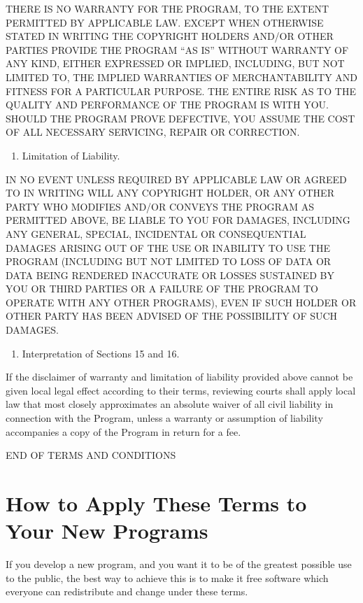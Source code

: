 \documentclass[letterpaper,10pt,english]{sphinxmanual}
\begin{document}
\sphinxAtStartPar
THERE IS NO WARRANTY FOR THE PROGRAM, TO THE EXTENT PERMITTED BY APPLICABLE LAW. EXCEPT WHEN OTHERWISE STATED IN WRITING THE COPYRIGHT HOLDERS AND/OR OTHER PARTIES PROVIDE THE PROGRAM “AS IS” WITHOUT WARRANTY OF ANY KIND, EITHER EXPRESSED OR IMPLIED, INCLUDING, BUT NOT LIMITED TO, THE IMPLIED WARRANTIES OF MERCHANTABILITY AND FITNESS FOR A PARTICULAR PURPOSE. THE ENTIRE RISK AS TO THE QUALITY AND PERFORMANCE OF THE PROGRAM IS WITH YOU. SHOULD THE PROGRAM PROVE DEFECTIVE, YOU ASSUME THE COST OF ALL NECESSARY SERVICING, REPAIR OR CORRECTION.
\begin{enumerate}
%
\setcounter{enumi}{15}
\item {} 
\sphinxAtStartPar
Limitation of Liability.

\end{enumerate}

\sphinxAtStartPar
IN NO EVENT UNLESS REQUIRED BY APPLICABLE LAW OR AGREED TO IN WRITING WILL ANY COPYRIGHT HOLDER, OR ANY OTHER PARTY WHO MODIFIES AND/OR CONVEYS THE PROGRAM AS PERMITTED ABOVE, BE LIABLE TO YOU FOR DAMAGES, INCLUDING ANY GENERAL, SPECIAL, INCIDENTAL OR CONSEQUENTIAL DAMAGES ARISING OUT OF THE USE OR INABILITY TO USE THE PROGRAM (INCLUDING BUT NOT LIMITED TO LOSS OF DATA OR DATA BEING RENDERED INACCURATE OR LOSSES SUSTAINED BY YOU OR THIRD PARTIES OR A FAILURE OF THE PROGRAM TO OPERATE WITH ANY OTHER PROGRAMS), EVEN IF SUCH HOLDER OR OTHER PARTY HAS BEEN ADVISED OF THE POSSIBILITY OF SUCH DAMAGES.
\begin{enumerate}
%
\setcounter{enumi}{16}
\item {} 
\sphinxAtStartPar
Interpretation of Sections 15 and 16.

\end{enumerate}

\sphinxAtStartPar
If the disclaimer of warranty and limitation of liability provided above cannot be given local legal effect according to their terms, reviewing courts shall apply local law that most closely approximates an absolute waiver of all civil liability in connection with the Program, unless a warranty or assumption of liability accompanies a copy of the Program in return for a fee.

\sphinxAtStartPar
END OF TERMS AND CONDITIONS


\section{How to Apply These Terms to Your New Programs}
\label{\detokenize{license:how-to-apply-these-terms-to-your-new-programs}}
\sphinxAtStartPar
If you develop a new program, and you want it to be of the greatest possible use to the public, the best way to achieve this is to make it free software which everyone can redistribute and change under these terms.
\end{document}
